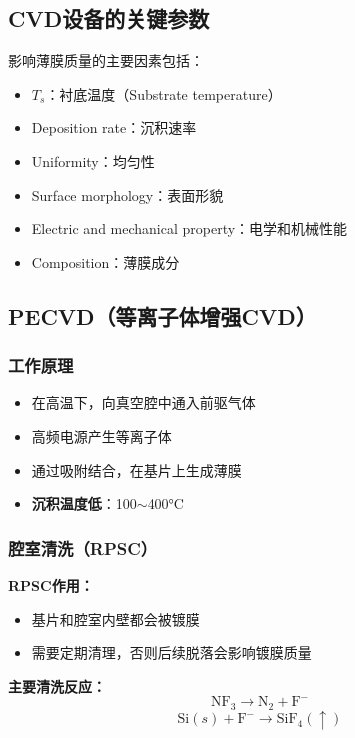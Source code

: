 \documentclass[UTF8,12pt,a4paper]{ctexart}
\begin{document}
\subsection{CVD设备的关键参数}

影响薄膜质量的主要因素包括：

\begin{itemize}
    \item $T_s$：衬底温度（Substrate temperature）
    \item Deposition rate：沉积速率
    \item Uniformity：均匀性
    \item Surface morphology：表面形貌
    \item Electric and mechanical property：电学和机械性能
    \item Composition：薄膜成分
\end{itemize}

\subsection{PECVD（等离子体增强CVD）}

\subsubsection{工作原理}

\begin{itemize}
    \item 在高温下，向真空腔中通入前驱气体
    \item 高频电源产生等离子体
    \item 通过吸附结合，在基片上生成薄膜
    \item \textbf{沉积温度低}：100$\sim$400°C
\end{itemize}

\subsubsection{腔室清洗（RPSC）}

\textbf{RPSC作用：}
\begin{itemize}
    \item 基片和腔室内壁都会被镀膜
    \item 需要定期清理，否则后续脱落会影响镀膜质量
\end{itemize}

\textbf{主要清洗反应：}
\begin{equation}
\text{NF}_3 \rightarrow \text{N}_2 + \text{F}^-
\end{equation}
\begin{equation}
\text{Si}(s) + \text{F}^- \rightarrow \text{SiF}_4(\uparrow)
\end{equation}
\end{document}
